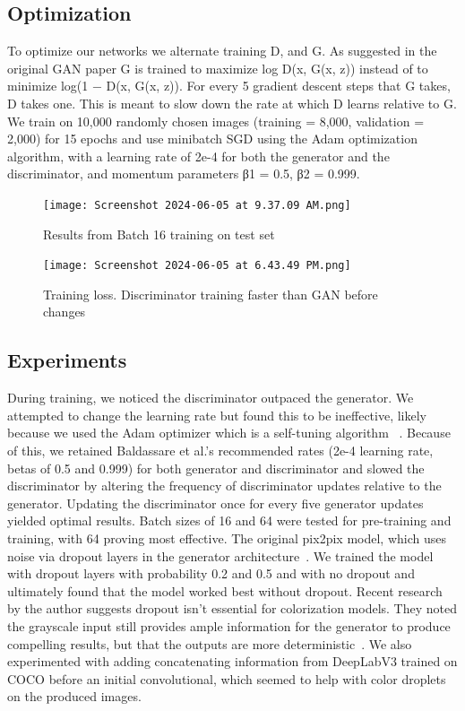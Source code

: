 \documentclass[10pt,twocolumn,letterpaper]{article}
\begin{document}
\subsection{Optimization}
To optimize our networks we alternate training D, and G. As suggested in the original GAN paper G is trained to maximize log D(x, G(x, z)) instead of to minimize log(1 − D(x, G(x, z)). For every 5 gradient descent steps that G takes, D takes one. This is meant to slow down the rate at which D learns relative to G. We train on 10,000 randomly chosen images (training = 8,000, validation = 2,000) for 15 epochs and use minibatch SGD using the  Adam optimization algorithm, with a learning rate of 2e-4 for both the generator and the discriminator, and momentum parameters β1 = 0.5, β2 = 0.999.
\begin{figure}
    \centering
    \texttt{[image: Screenshot 2024-06-05 at 9.37.09 AM.png]}
    \caption{Results from Batch 16 training on test set}
    \label{fig:enter-label}
\end{figure}

\begin{figure}
    \centering
    \texttt{[image: Screenshot 2024-06-05 at 6.43.49 PM.png]}
    \caption{Training loss. Discriminator training faster than GAN before changes}
    \label{fig:enter-label}
\end{figure}
\subsection{Experiments}
During training, we noticed the discriminator outpaced the generator. We attempted to change the learning rate but found this to be ineffective, likely because we used the Adam optimizer which is a self-tuning algorithm ~\cite{Kingma}. Because of this, we retained Baldassare et al.'s recommended rates (2e-4 learning rate, betas of 0.5 and 0.999) for both generator and discriminator and slowed the discriminator by altering the frequency of discriminator updates relative to the generator. Updating the discriminator once for every five generator updates yielded optimal results. Batch sizes of 16 and 64 were tested for pre-training and training, with 64 proving most effective. The original pix2pix model, which uses noise via dropout layers in the generator architecture~\cite{Pix2Pix}. We trained the model with dropout layers with probability 0.2 and 0.5 and with no dropout and ultimately found that the model worked best without dropout. Recent research by the author suggests dropout isn't essential for colorization models. They noted the grayscale input still provides ample information for the generator to produce compelling results, but that the outputs are more deterministic~\cite{Pix2Pix, Shariatnia}. We also experimented with adding concatenating information from DeepLabV3 trained on COCO before an initial convolutional, which seemed to help with color droplets on the produced images.
\end{document}

